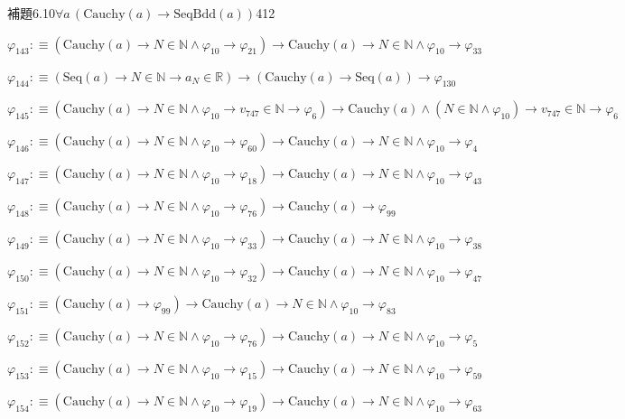 \begin{fullproof}{補題6.10}{$\forall a\,(\mathrm{Cauchy}(a) \to \mathrm{SeqBdd}(a))$}{412}
\begin{abbrevlist}
\item $\varphi_{143} :\equiv (\mathrm{Cauchy}(a) \to N \in \mathbb{N} \land \varphi_{10} \to \varphi_{21}) \to \mathrm{Cauchy}(a) \to N \in \mathbb{N} \land \varphi_{10} \to \varphi_{33}$
\item $\varphi_{144} :\equiv (\mathrm{Seq}(a) \to N \in \mathbb{N} \to a_{N} \in \mathbb{R}) \to (\mathrm{Cauchy}(a) \to \mathrm{Seq}(a)) \to \varphi_{130}$
\item $\varphi_{145} :\equiv (\mathrm{Cauchy}(a) \to N \in \mathbb{N} \land \varphi_{10} \to v_{747} \in \mathbb{N} \to \varphi_{6}) \to \mathrm{Cauchy}(a) \land (N \in \mathbb{N} \land \varphi_{10}) \to v_{747} \in \mathbb{N} \to \varphi_{6}$
\item $\varphi_{146} :\equiv (\mathrm{Cauchy}(a) \to N \in \mathbb{N} \land \varphi_{10} \to \varphi_{60}) \to \mathrm{Cauchy}(a) \to N \in \mathbb{N} \land \varphi_{10} \to \varphi_{4}$
\item $\varphi_{147} :\equiv (\mathrm{Cauchy}(a) \to N \in \mathbb{N} \land \varphi_{10} \to \varphi_{18}) \to \mathrm{Cauchy}(a) \to N \in \mathbb{N} \land \varphi_{10} \to \varphi_{43}$
\item $\varphi_{148} :\equiv (\mathrm{Cauchy}(a) \to N \in \mathbb{N} \land \varphi_{10} \to \varphi_{76}) \to \mathrm{Cauchy}(a) \to \varphi_{99}$
\item $\varphi_{149} :\equiv (\mathrm{Cauchy}(a) \to N \in \mathbb{N} \land \varphi_{10} \to \varphi_{33}) \to \mathrm{Cauchy}(a) \to N \in \mathbb{N} \land \varphi_{10} \to \varphi_{38}$
\item $\varphi_{150} :\equiv (\mathrm{Cauchy}(a) \to N \in \mathbb{N} \land \varphi_{10} \to \varphi_{32}) \to \mathrm{Cauchy}(a) \to N \in \mathbb{N} \land \varphi_{10} \to \varphi_{47}$
\item $\varphi_{151} :\equiv (\mathrm{Cauchy}(a) \to \varphi_{99}) \to \mathrm{Cauchy}(a) \to N \in \mathbb{N} \land \varphi_{10} \to \varphi_{83}$
\item $\varphi_{152} :\equiv (\mathrm{Cauchy}(a) \to N \in \mathbb{N} \land \varphi_{10} \to \varphi_{76}) \to \mathrm{Cauchy}(a) \to N \in \mathbb{N} \land \varphi_{10} \to \varphi_{5}$
\item $\varphi_{153} :\equiv (\mathrm{Cauchy}(a) \to N \in \mathbb{N} \land \varphi_{10} \to \varphi_{15}) \to \mathrm{Cauchy}(a) \to N \in \mathbb{N} \land \varphi_{10} \to \varphi_{59}$
\item $\varphi_{154} :\equiv (\mathrm{Cauchy}(a) \to N \in \mathbb{N} \land \varphi_{10} \to \varphi_{19}) \to \mathrm{Cauchy}(a) \to N \in \mathbb{N} \land \varphi_{10} \to \varphi_{63}$

\end{abbrevlist}
\end{fullproof}
